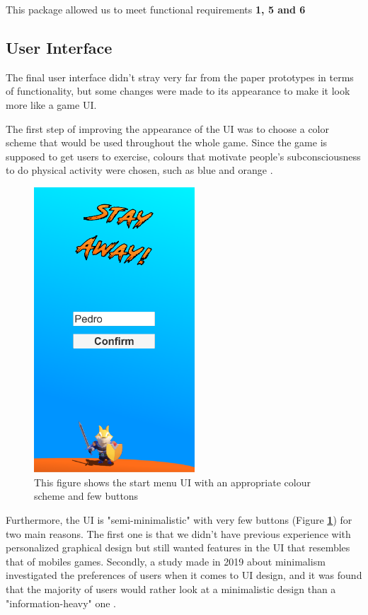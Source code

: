 \documentclass{dissertation}
\begin{document}
This package allowed us to meet functional requirements \textbf{1, 5 and 6}

\subsection{User Interface}
The final user interface didn't stray very far from the paper prototypes in terms of functionality, but some changes were made to its appearance to make it look more like a game UI. 

The first step of improving the appearance of the UI was to choose a color scheme that would be used throughout the whole game. Since the game is supposed to get users to exercise, colours that motivate people's subconsciousness to do physical activity were chosen, such as blue and orange \citep{Elliot15}.

\begin{figure}[H]
\centering
\includegraphics[width = 6cm]{images/final-ui.png}
\caption{This figure shows the start menu UI with an appropriate colour scheme and few buttons}
\label{fig:final-ui}
\end{figure}

Furthermore, the UI is "semi-minimalistic" with very few buttons (Figure \textbf{\ref{fig:final-ui}}) for two main reasons. The first one is that we didn't have previous experience with personalized graphical design but still wanted features in the UI that resembles that of mobiles games. Secondly, a study made in 2019 about minimalism investigated the preferences of users when it comes to UI design, and it was found that the majority of users would rather look at a minimalistic design than a "information-heavy" one \citep{Dong19}.
\end{document}
